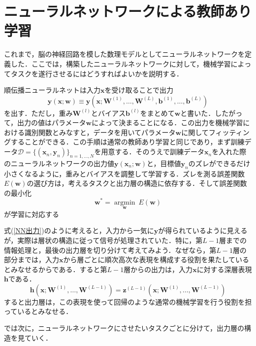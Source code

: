 \documentclass[a4paper,11pt]{jsreport}
\begin{document}
\section{ニューラルネットワークによる教師あり学習}
これまで，脳の神経回路を模した数理モデルとしてニューラルネットワークを定義した．ここでは，構築したニューラルネットワークに対して，機械学習によってタスクを遂行させるにはどうすればよいかを説明する．\par
順伝播ニューラルネットは入力$\bm{x}$を受け取ることで出力
\begin{equation}
  \bm{y}(\bm{x}; \bm{w})
  \equiv \bm{y}\left( \bm{x}; \bm{W}^{(1)},\dots ,\bm{W}^{(L)},\bm{b}^{(1)},\dots ,\bm{b}^{(L)} \right) \label{NN出力}
\end{equation}
を出す．ただし，重み$\bm{W}^{(l)}$とバイアス$\bm{b}^{(l)}$をまとめて$\bm{w}$と書いた．したがって，出力の値はパラメータ$\bm{w}$によって決まることになる．この出力を機械学習における識別関数とみなすと，データを用いてパラメータ$\bm{w}$に関してフィッティングすることができる．この手順は通常の教師あり学習と同じであり，まず訓練データ$\mathcal{D}=\{ (\bm{x}_n, \bm{y}_n) \}_{n=1,\dots ,N}$を用意する．そのうえで訓練データ$\bm{x}_n$を入れた際のニューラルネットワークの出力値$\bm{y}(\bm{x}_n; \bm{w})$と，目標値$\bm{y}_n$のズレができるだけ小さくなるように，重みとバイアスを調整して学習する．ズレを測る誤差関数$E(\bm{w})$の選び方は，考えるタスクと出力層の構造に依存する．そして誤差関数の最小化
\begin{equation}
  \bm{w}^* = \underset{\bm{w}} {\operatorname{argmin}} \ E(\bm{w})
\end{equation}
が学習に対応する\par
式(\ref{NN出力})のように考えると，入力から一気に$\bm{y}$が得られているように見えるが，実際は層状の構造に従って信号が処理されていた．特に，第$L-1$層までの情報処理と，最後の出力層を切り分けて考えてみよう．なぜなら，第$L-1$層の部分までは，入力$\bm{x}$から層ごとに順次高次な表現を構成する役割を果たしているとみなせるからである．すると第$L-1$層からの出力は，入力$\bm{x}$に対する深層表現$\bm{h}$である．
\begin{equation}
  \bm{h}\left( \bm{x}; \bm{W}^{(1)},\dots ,\bm{W}^{(L-1)} \right)
  = \bm{z}^{(L-1)}\left( \bm{x}; \bm{W}^{(1)},\dots ,\bm{W}^{(L-1)} \right)
\end{equation}
すると出力層は，この表現を使って回帰のような通常の機械学習を行う役割を担っているとみなせる．\par
では次に，ニューラルネットワークにさせたいタスクごとに分けて，出力層の構造を見ていく．
\end{document}
